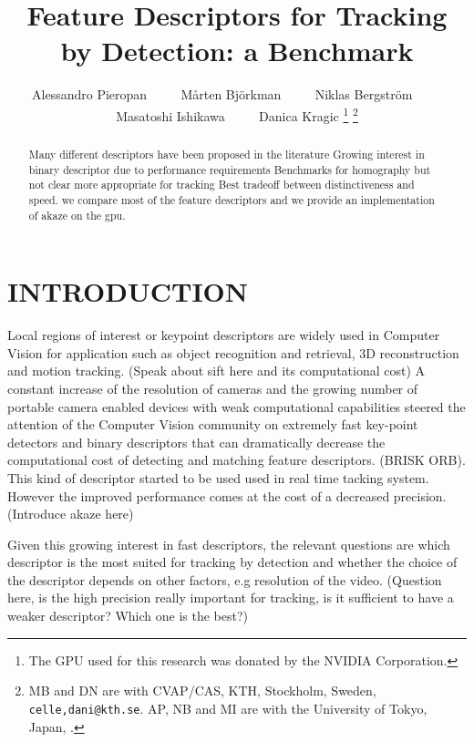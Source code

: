 \documentclass[letterpaper, 10pt, conference]{ieeeconf}
\title{\LARGE \bf Feature Descriptors for Tracking by Detection: a Benchmark}
\author{Alessandro Pieropan ~~~~ Mårten Bj{\"o}rkman  ~~~~ Niklas Bergstr{\"o}m ~~~~  Masatoshi Ishikawa ~~~~ Danica Kragic%
\thanks{The GPU used for this research was donated by the NVIDIA Corporation.}
\thanks{MB and DN are with CVAP/CAS, KTH, Stockholm, Sweden, {\tt celle,dani@kth.se}. AP, NB and MI are with the University of Tokyo, Japan, {\tt }.}}
\begin{document}
                                                                
                                                                                
\maketitle                                                                      
\thispagestyle{empty}                                                           
\pagestyle{empty}



\begin{abstract}

Many different descriptors have been proposed in the literature
Growing interest in binary descriptor due to performance requirements
Benchmarks for homography but not clear more appropriate for tracking
Best tradeoff between distinctiveness and speed. 
we compare most of the feature descriptors and we provide an implementation of 
akaze on the gpu.
\end{abstract}

\section{INTRODUCTION}
\label{sec:introduction}

Local regions of interest or keypoint descriptors are widely used in Computer Vision for application such as object recognition and retrieval, 3D reconstruction and motion tracking. (Speak about sift here and its computational cost) A constant increase of the resolution of cameras and the growing number of portable camera enabled devices with weak computational capabilities steered the attention of the Computer Vision community on extremely fast key-point detectors and binary descriptors that can dramatically decrease the computational cost of detecting and matching feature descriptors. (BRISK ORB). This kind of descriptor started to be used used in real time tacking system. However the improved performance comes at the cost of a decreased precision. (Introduce akaze here)

Given this growing interest in fast descriptors, the relevant questions are which descriptor is the most suited for tracking by detection and whether the choice of the descriptor depends on other factors, e.g resolution of the video. (Question here, is the high precision really important for tracking, is it sufficient to have a weaker descriptor? Which one is the best?)
\end{document}
